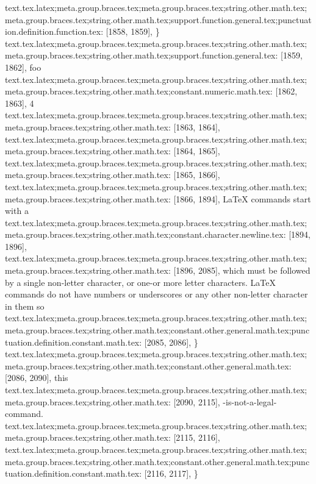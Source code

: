 {{{{{{{{{{{{{{{{{{{{{{{{{{{{{{{{{{{{{{{{{{{{{{{{{{}
text.tex.latex;meta.group.braces.tex;meta.group.braces.tex;string.other.math.tex;meta.group.braces.tex;string.other.math.tex;support.function.general.tex;punctuation.definition.function.tex: [1858, 1859], {\}
text.tex.latex;meta.group.braces.tex;meta.group.braces.tex;string.other.math.tex;meta.group.braces.tex;string.other.math.tex;support.function.general.tex: [1859, 1862], {foo}
text.tex.latex;meta.group.braces.tex;meta.group.braces.tex;string.other.math.tex;meta.group.braces.tex;string.other.math.tex;constant.numeric.math.tex: [1862, 1863], {4}
text.tex.latex;meta.group.braces.tex;meta.group.braces.tex;string.other.math.tex;meta.group.braces.tex;string.other.math.tex: [1863, 1864], {
}
text.tex.latex;meta.group.braces.tex;meta.group.braces.tex;string.other.math.tex;meta.group.braces.tex;string.other.math.tex: [1864, 1865], {
}
text.tex.latex;meta.group.braces.tex;meta.group.braces.tex;string.other.math.tex;meta.group.braces.tex;string.other.math.tex: [1865, 1866], {
}
text.tex.latex;meta.group.braces.tex;meta.group.braces.tex;string.other.math.tex;meta.group.braces.tex;string.other.math.tex: [1866, 1894], {LaTeX commands start with a }
text.tex.latex;meta.group.braces.tex;meta.group.braces.tex;string.other.math.tex;meta.group.braces.tex;string.other.math.tex;constant.character.newline.tex: [1894, 1896], {\\}
text.tex.latex;meta.group.braces.tex;meta.group.braces.tex;string.other.math.tex;meta.group.braces.tex;string.other.math.tex: [1896, 2085], { which must be followed by a single non-letter character, or one-or more letter characters.  LaTeX commands do not have numbers or underscores or any other non-letter character in them  so }
text.tex.latex;meta.group.braces.tex;meta.group.braces.tex;string.other.math.tex;meta.group.braces.tex;string.other.math.tex;constant.other.general.math.tex;punctuation.definition.constant.math.tex: [2085, 2086], {\}
text.tex.latex;meta.group.braces.tex;meta.group.braces.tex;string.other.math.tex;meta.group.braces.tex;string.other.math.tex;constant.other.general.math.tex: [2086, 2090], {this}
text.tex.latex;meta.group.braces.tex;meta.group.braces.tex;string.other.math.tex;meta.group.braces.tex;string.other.math.tex: [2090, 2115], {-is-not-a-legal-command.
}
text.tex.latex;meta.group.braces.tex;meta.group.braces.tex;string.other.math.tex;meta.group.braces.tex;string.other.math.tex: [2115, 2116], {
}
text.tex.latex;meta.group.braces.tex;meta.group.braces.tex;string.other.math.tex;meta.group.braces.tex;string.other.math.tex;constant.other.general.math.tex;punctuation.definition.constant.math.tex: [2116, 2117], {\}
}}}}}}}}}}}}}}}}}}}}}}}}}}}}}}}}}}}}}}}}}}}}}}}}}}}}
